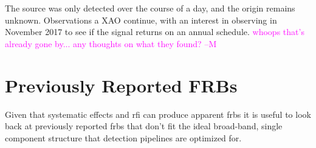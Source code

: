 \documentclass[a4paper,fleqn,usenatbib]{mnras}
\newcommand{\cM}[1]{\textcolor{magenta}{ #1 --M}}
\begin{document}
The source was only detected over the course of a day, and the origin remains
unknown.  Observations a XAO continue, with an interest in observing in November
2017 to see if the signal returns on an annual schedule. \cM{whoops that's already gone by... any thoughts on what they found?}

\section{Previously Reported FRBs}
\label{sec:previous_frbs}

Given that systematic effects and \gls{rfi} can produce apparent \glspl{frb} it
is useful to look back at previously reported \glspl{frb} that don't fit the
ideal broad-band, single component structure that detection pipelines are
optimized for.

\end{document}
